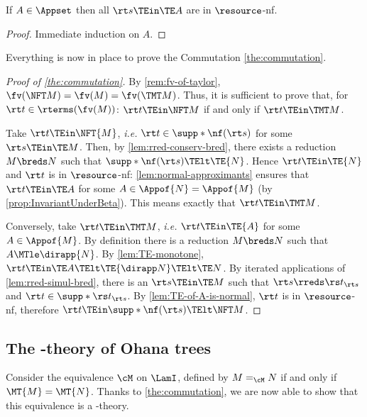 \setcounter{lem:TE-of-A-is-normal}{\thetheorem}
\begin{lemma}
\label{lem:TE-of-A-is-normal}
	If $A \in \Appset$ then all $\rt s \TEin \TE A$
	are in $\resource$-nf.
\end{lemma}

	\begin{proof}
	Immediate induction on $A$.
	\end{proof}

Everything is now in place to prove the Commutation \cref{the:commutation}.

\begin{proof}[Proof of \cref{the:commutation}]
	By \cref{rem:fv-of-taylor}, $\fv(\NFT M) = \fv(M) = \fv(\TMT M)$.
	Thus, it is sufficient to prove that, 
	for $\rt t \in \rterms(\fv(M))$:
	$\rt t \TEin \NFT M$ if and only if $\rt t \TEin \TMT M$.
	
	Take $\rt t \TEin \NFT{M}$, \emph{i.e.} $\rt t \in \supp*{\nf(\rt s)}$
	for some $\rt s \TEin \TE M$.
	Then, by \cref{lem:rred-conserv-bred}, there exists
	a reduction $M \breds N$
	such that $\supp*{\nf(\rt s)} \TElt \TE{N}$.
	Hence $\rt t \TEin \TE{N}$ and $\rt t$ is in $\resource$-nf: 
	\cref{lem:normal-approximants} ensures that $\rt t \TEin \TE A$ 
	for some $A\in \Appof{N}=\Appof{M}$ (by \cref{prop:InvariantUnderBeta}).
	This means exactly that $\rt t \TEin \TMT M$.
	
	Conversely, take $\rt t \TEin \TMT M$, \emph{i.e.}
	$\rt t \TEin \TE{A}$ for some $A \in \Appof{M}$.
	By definition there is a reduction $M \breds N$
	such that $A \MTle \dirapp{N}$.
	By \cref{lem:TE-monotone},
	$\rt t \TEin \TE A \TElt \TE{\dirapp N} \TElt \TE N$.
	By iterated applications of \cref{lem:rred-simul-bred}, 
	there is an $\rt s \TEin \TE M$ such that
	$\rt s \rreds \rs t_{\rt s}$ and $\rt t \in \supp*{\rs t_{\rt s}}$.
	By \cref{lem:TE-of-A-is-normal}, $\rt t$ is in $\resource$-nf,
	therefore $\rt t \TEin \supp*{\nf(\rt s)} \TElt \NFT M$.
\end{proof}


\subsection{The \lamI-theory of Ohana trees}

Consider the equivalence $\cM$ on $\LamI$, 
defined by $M =_{\cM} N$ if and only if $\MT{M} = \MT{N}$.
Thanks to \cref{the:commutation},
we are now able to show that this equivalence is a \lamI-theory.

